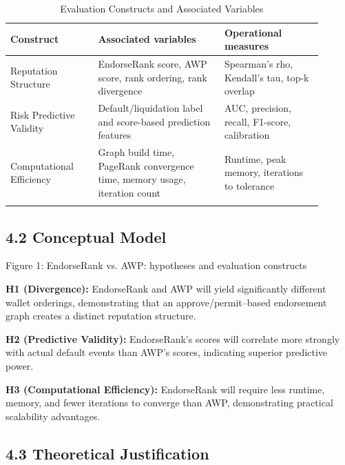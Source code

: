 \documentclass[12pt]{article}
\begin{document}
\begin{longtable}{>{\raggedright\arraybackslash}p{0.25\linewidth}>{\raggedright\arraybackslash}p{0.36\linewidth}>{\raggedright\arraybackslash}p{0.29\linewidth}}
\caption{Evaluation Constructs and Associated Variables}\\
\toprule
\textbf{Construct} & \textbf{Associated variables} & \textbf{Operational measures} \\
\midrule
Reputation Structure & EndorseRank score, AWP score, rank ordering, rank divergence & Spearman's rho, Kendall's tau, top-k overlap \\
\addlinespace
Risk Predictive Validity & Default/liquidation label and score-based prediction features & AUC, precision, recall, F1-score, calibration \\
\addlinespace
Computational Efficiency & Graph build time, PageRank convergence time, memory usage, iteration count & Runtime, peak memory, iterations to tolerance \\
\addlinespace
\bottomrule
\end{longtable}

\subsection*{4.2 Conceptual Model}
\label{sec:conceptual-model}

\begin{center}

\end{center}


\begin{center}Figure 1: EndorseRank vs. AWP: hypotheses and evaluation constructs\end{center}

\textbf{H1 (Divergence): }EndorseRank and AWP will yield significantly different wallet orderings, demonstrating that an approve/permit--based endorsement graph creates a distinct reputation structure.


\textbf{H2 (Predictive Validity): }EndorseRank's scores will correlate more strongly with actual default events than AWP's scores, indicating superior predictive power.


\textbf{H3 (Computational Efficiency): }EndorseRank will require less runtime, memory, and fewer iterations to converge than AWP, demonstrating practical scalability advantages.


\subsection*{4.3 Theoretical Justification}
\label{sec:theoretical-justification}
\end{document}
